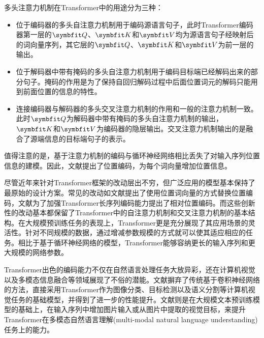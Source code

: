 多头注意力机制在Transformer中的用途分为三种：
\begin{itemize}
    \item 位于编码器的多头自注意力机制用于编码源语言句子，此时Transformer编码器第一层的$\Vector{Q}$、$\Vector{K}$和$\Vector{V}$均为源语言句子经映射后的词向量序列，其它层的$\Vector{Q}$、$\Vector{K}$和$\Vector{V}$为前一层的输出。
    \item 位于解码器中带有掩码的多头自注意力机制用于编码目标端已经解码出来的部分句子。掩码的作用是为了保持自回归解码过程中后面位置词元的解码只能用到前面位置的信息的特性。
    \item 连接编码器与解码器的多头交叉注意力机制的作用和一般的注意力机制一致。此时$\Vector{Q}$为解码器中带有掩码的多头自注意力机制的输出，$\Vector{K}$和$\Vector{V}$为编码器的隐层输出。交叉注意力机制输出的是融合了源端信息的目标端句子的表示。
\end{itemize}
值得注意的是，基于注意力机制的编码与循环神经网络相比丢失了对输入序列位置信息的建模。因此，文献\cite{5_DBLP:journals/corr/VaswaniSPUJGKP17}提出了位置编码，为每个词向量增加位置信息。%

尽管近年来针对Transformer框架的改动层出不穷，但广泛应用的模型基本保持了最原始的设计方案。常见的改动如文献\cite{7_DBLP:conf/naacl/DevlinCLT19}提出了使用位置词向量的方式替换位置编码，文献\cite{8_DBLP:journals/corr/abs-1803-02155,9_DBLP:journals/corr/abs-1901-02860}为了加强Transformer长序列编码能力提出了相对位置编码。而这些创新性的改动基本都保留了Transformer中的自注意力机制和交叉注意力机制的基本结构。在大规模预训练任务的表现上，Transformer更是充分展现了其应用场景的灵活性。针对不同规模的数据，通过增减参数规模的方式就可以使其适应相应的任务。相比于基于循环神经网络的模型，Transformer能够容纳更长的输入序列和更大规模的网络参数。

Transformer出色的编码能力不仅在自然语言处理任务大放异彩，还在计算机视觉以及多模态信息融合等领域展现了不俗的潜能。文献\cite{10_DBLP:journals/corr/abs-1802-05751,11_DBLP:conf/iclr/DosovitskiyB0WZ21,12_DBLP:conf/iccv/LiuL00W0LG21,13_DBLP:conf/iccv/0007CWYSJTFY21}摒弃了传统基于卷积神经网络的方法，直接采用Transformer作为图像分类、目标检测以及语义分割等计算机视觉任务的基础模型，并得到了进一步的性能提升。文献\cite{14_DBLP:conf/nips/LuBPL19,15_DBLP:conf/eccv/ChenLYK0G0020,16_DBLP:journals/corr/abs-2004-00849,17_DBLP:conf/icml/KimSK21}则是在大规模文本预训练模型的基础上，在输入序列中增加图片输入或从图片中提取的视觉目标，来提升Transformer在多模态自然语言理解(multi-modal natural language understanding)任务上的能力。


